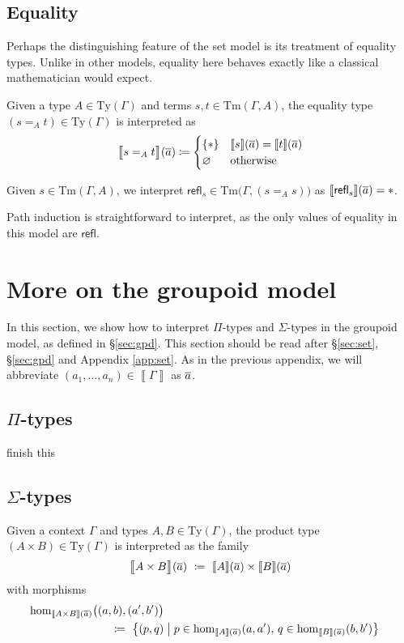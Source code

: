 \documentclass{article}
\theoremstyle{definition}
\renewcommand{\int}[1]{\mathopen{}\left\llbracket #1
    \right\rrbracket\mathclose{}}       %
\newcommand{\refl}{\mathsf{refl}}
\newcommand{\Ty}{\mathrm{Ty}}
\newcommand{\Tm}{\mathrm{Tm}}
\renewcommand{\hom}[3][]{\mathrm{hom}_{#1}\mathopen{}\left( #2, #3 \right)\mathclose{}}
\newcommand{\defeq}{
	\mathrel{\mathrel{\mathop:}\mkern-1.2mu=}}	%
\newcommand{\tup}[1]{\overline{\smash{#1}\vphantom{a}}}
\newcommand{\n}{%
}                %
\begin{document}
\subsection{Equality}
\label{sec:set-eq}

Perhaps the distinguishing feature of the set model is its treatment of equality types. Unlike in other models, equality here behaves exactly like a classical mathematician would expect.

Given a type $A \in \Ty(\Gamma)$ and terms $s, t \in \Tm(\Gamma, A)$, the equality type $(s =_A t) \in \Ty(\Gamma)$ is interpreted as
$$\int{\big.s =_A t}\n(\tup{a}) \defeq \begin{cases}
    \{ * \} & \int{s}(\tup{a}) = \int{t}(\tup{a}) \\
    \varnothing & \text{otherwise}
\end{cases}$$

Given $s \in \Tm(\Gamma,A)$, we interpret $\refl_s \in \Tm\big(\Gamma, (s =_A s) \big)$ as $\int{\refl_s}(\tup{a}) = *$.

{\color{red}
Path induction is straightforward to interpret, as the only values of equality in this model are $\refl$.
}


\section{More on the groupoid model}
\label{app:gpd}

In this section, we show how to interpret $\Pi$-types and $\Sigma$-types in the groupoid model, as defined in \S\ref{sec:gpd}. This section should be read after \S\ref{sec:set}, \S\ref{sec:gpd} and Appendix \ref{app:set}. As in the previous appendix, we will abbreviate $(a_1,\ldots,a_n) \in \int{\Gamma}$ as $\tup{a}$.


\subsection{\texorpdfstring{$\Pi$}{Pi}-types}
\label{sec:gpd-pi}

{\color{red} finish this}


\subsection{\texorpdfstring{$\Sigma$}{Sigma}-types}

Given a context $\Gamma$ and types $A, B \in \Ty(\Gamma)$, the product type $(A \times B) \in \Ty(\Gamma)$ is interpreted as the family
$$\int{\big.A \times B}\n(\tup{a})\ \defeq\ \int{A}\n(\tup{a}) \times \int{B}\n(\tup{a})$$
with morphisms
\begin{align*}
    \hom[\int{A \times B}(\tup{a})]{\big.(a,b)}{(a',b')}\\ \defeq\ \big\{ (p,q)& \mathrel{\big|} p \in \hom[\int{A}(\tup{a})]{a}{a'},\, q \in \hom[\int{B}(\tup{a})]{b}{b'} \big\}
\end{align*}
\end{document}
